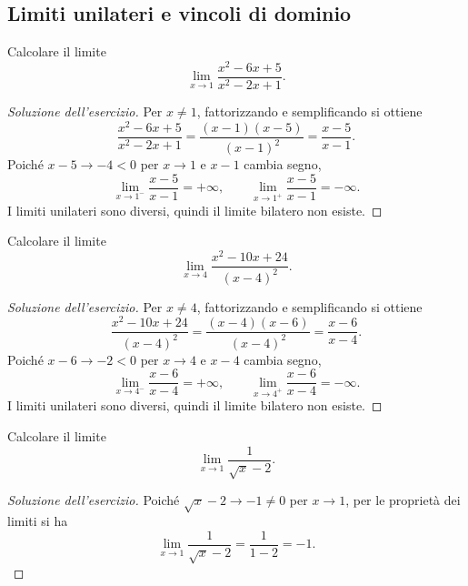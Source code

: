 \subsection{Limiti unilateri e vincoli di dominio}
\label{sec:esercizi-limiti-limiti-unilateri-e-dominio}

\begin{exercise}
\label{ex:limiti-foglio-2311-07}
Calcolare il limite
\[
  \lim_{x\to1}\frac{x^2-6x+5}{x^2-2x+1}.
\]
\end{exercise}
\begin{proof}[Soluzione dell'esercizio]
Per $x\ne1$, fattorizzando e semplificando si ottiene
\[
  \frac{x^2-6x+5}{x^2-2x+1}
  =\frac{(x-1)(x-5)}{(x-1)^2}
  =\frac{x-5}{x-1}.
\]
Poiché $x-5\to-4<0$ per $x\to1$ e $x-1$ cambia segno,
\[
  \lim_{x\to1^-}\frac{x-5}{x-1}=+\infty,
  \qquad
  \lim_{x\to1^+}\frac{x-5}{x-1}=-\infty.
\]
I limiti unilateri sono diversi, quindi il limite bilatero non esiste.
\end{proof}

\begin{exercise}
\label{ex:limiti-foglio-2311-09}
Calcolare il limite
\[
  \lim_{x\to4}\frac{x^2-10x+24}{(x-4)^2}.
\]
\end{exercise}
\begin{proof}[Soluzione dell'esercizio]
Per $x\ne4$, fattorizzando e semplificando si ottiene
\[
  \frac{x^2-10x+24}{(x-4)^2}
  =\frac{(x-4)(x-6)}{(x-4)^2}
  =\frac{x-6}{x-4}.
\]
Poiché $x-6\to-2<0$ per $x\to4$ e $x-4$ cambia segno,
\[
  \lim_{x\to4^-}\frac{x-6}{x-4}=+\infty,
  \qquad
  \lim_{x\to4^+}\frac{x-6}{x-4}=-\infty.
\]
I limiti unilateri sono diversi, quindi il limite bilatero non esiste.
\end{proof}

\begin{exercise}
\label{ex:limiti-foglio-2311-10}
Calcolare il limite
\[
  \lim_{x\to1}\frac1{\sqrt{x}-2}.
\]
\end{exercise}
\begin{proof}[Soluzione dell'esercizio]
Poiché $\sqrt{x}-2\to-1\ne0$ per $x\to1$,
per le proprietà dei limiti si ha
\[
  \lim_{x\to1}\frac1{\sqrt{x}-2}
  =\frac1{1-2}=-1.
\]
\end{proof}

